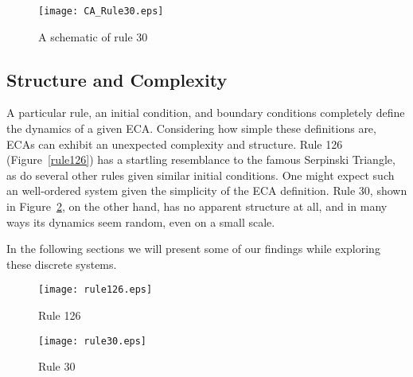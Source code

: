 \begin{figure}
    \centering
    \texttt{[image: CA\_Rule30.eps]}
    \caption{\label{carule30} A schematic of rule 30}
\end{figure}


\subsection{Structure and Complexity}
A particular rule, an initial condition, and boundary conditions
completely define the dynamics of a given ECA.
Considering how simple these definitions are, ECAs can exhibit an
unexpected complexity and structure.
Rule 126 (Figure~\ref{rule126}) has a startling resemblance to the
famous Serpinski Triangle, as do several other rules given similar
initial conditions.
One might expect such an well-ordered system given the simplicity of
the ECA definition.
Rule 30, shown in Figure~\ref{rule30}, on the other hand,  has no
apparent structure at all, and in many ways its dynamics seem random,
even on a small scale.

In the following sections we will present some of our findings while
exploring these discrete systems.

\begin{figure}
    \begin{minipage}[b]{0.49\textwidth}
        \centering
        \texttt{[image: rule126.eps]}
        \caption{\label{rule126} Rule 126}
    \end{minipage}
    \hspace{0.5cm}
    \begin{minipage}[b]{0.49\textwidth}
        \centering
        \texttt{[image: rule30.eps]}
        \caption{\label{rule30} Rule 30}
    \end{minipage}
\end{figure}
